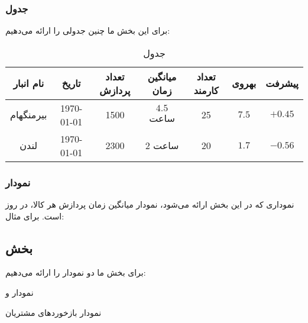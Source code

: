 \subsubsection{جدول}
برای این بخش ما چنین جدولی را ارائه می‌دهیم:
\begin{table}[H]
\begin{center}
\caption{جدول }
\begin{adjustbox}{width=\textwidth}
\begin{tabular}{|c|c|c|c|c|c|c|}
\hline
نام انبار &
تاریخ &
تعداد پردازش &
میانگین زمان &
تعداد کارمند &
بهروی &
پیشرفت \\
\hline
\hline
بیرمنگهام &
\today &
1500 &
$4.5$ ساعت &
25 &
$7.5$ &
$+0.45$ \\
\hline
لندن &
\today &
2300 &
2 ساعت &
20 &
$1.7$ &
$-0.56$ \\
\hline
\end{tabular}
\end{adjustbox}
\end{center}
\end{table}

\newpage
\subsubsection{نمودار}
نموداری که در این بخش ارائه می‌شود، نمودار میانگین زمان پردازش هر کالا، در روز است. برای مثال:
\begin{latin}
\begin{center}
\end{center}
\end{latin}

\subsection{بخش }\label{ssec:site}
برای بخش 
ما دو نمودار را ارائه می‌دهیم: 
\begin{enumerate*}
\item 
نمودار 
و
\item 
نمودار بازخورد‌های مشتریان
\end{enumerate*}

